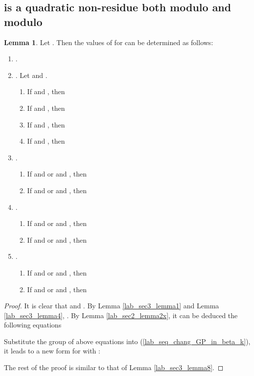 \documentclass{mcom-l}
\theoremstyle{definition}
\newtheorem{sec3lemma9}[sec3lemma1]{Lemma}
\numberwithin{equation}{section}
\begin{document}
 \subsection{ is a quadratic non-residue both modulo  and modulo }  
    
  \begin{sec3lemma9}\label{lab_sec3_lemma9}
  Let . Then the values of  for  can be determined as follows:
  \begin{enumerate} \item .
  
  \item . Let   and .
  \begin{enumerate}
  \item
  If  and , then
   
  \item
  If  and , then
  
  \item
  If  and , then
   
  \item
  If  and , then
    
  \end{enumerate}
  \item .
  \begin{enumerate}
  \item
  If  and  or  and , then
  
  \item
  If  and  or  and , then
  
  \end{enumerate}
  \item .
  \begin{enumerate}
  \item
  If  and  or  and , then
  
  \item
  If  and  or  and , then
  
  \end{enumerate}
  \item .
  \begin{enumerate}
  \item
  If  and  or  and , then
  
  \item
  If  and  or  and , then
  
  \end{enumerate}
  \end{enumerate}
  \end{sec3lemma9}
  \begin{proof}
  It is clear that  and . By Lemma \ref{lab_sec3_lemma1} and Lemma \ref{lab_sec3_lemma4}, . By Lemma \ref{lab_sec2_lemma2x}, it can be deduced the following equations
  
  Substitute the group of above equations into (\ref{lab_seq_chang_GP_in_beta_k}), it leads to a new form for  with :
  
  The rest of the proof is similar to that of Lemma \ref{lab_sec3_lemma8}.
  \end{proof}  
  
\end{document}
